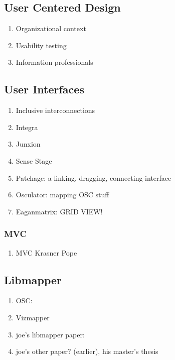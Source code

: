 \subsection{User Centered Design}
	\begin{enumerate}
		\item Organizational context 
		\item Usability testing 
		\item Information professionals 
	\end{enumerate}

\subsection{User Interfaces}
	\begin{enumerate}
		\item Inclusive interconnections 
		\item Integra 
		\item Junxion 
		\item Sense Stage 
		\item Patchage: a linking, dragging, connecting interface 
		\item Osculator: mapping OSC stuff 
		\item Eaganmatrix: GRID VIEW! 
	\end{enumerate}
		\subsubsection{MVC}
			\begin{enumerate}
				\item MVC Krasner Pope 
			\end{enumerate}

\subsection{Libmapper}
	\begin{enumerate}
		\item OSC: 
		\item Vizmapper 
		\item joe's libmapper paper: 
		\item joe's other paper? (earlier), his master's thesis
	\end{enumerate}


